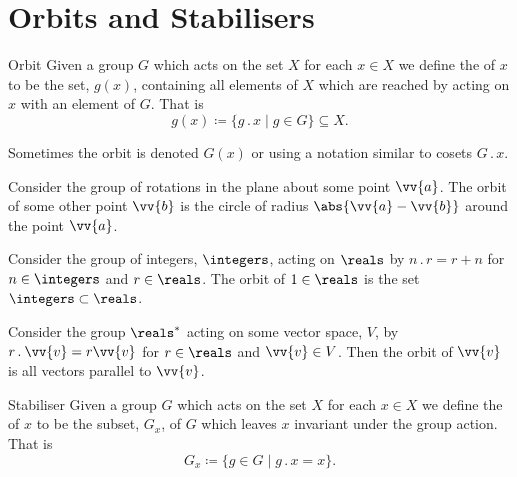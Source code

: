 \documentclass[fleqn]{NotesClass}
\newcommand*{\action}{\mathbin{.}}
\newcommand{\orbit}{\mathit{g}}
\begin{document}
    \section{Orbits and Stabilisers}
    
    \begin{dfn}{Orbit}{}
        Given a group \(G\) which acts on the set \(X\) for each \(x \in X\) we define the  of \(x\) to be the set, \(\orbit(x)\), containing all elements of \(X\) which are reached by acting on \(x\) with an element of \(G\).
        That is
        \begin{equation}
            \orbit(x) \coloneqq \{g\action x \mid g \in G\} \subseteq X.
        \end{equation}
        \begin{ntn}{}{}
            Sometimes the orbit is denoted \(G(x)\) or using a notation similar to cosets \(G\action x\).
        \end{ntn}
    \end{dfn}

    \begin{exm}{}{}
        Consider the group of rotations in the plane about some point \(\vv{a}\).
        The orbit of some other point \(\vv{b}\) is the circle of radius \(\abs{\vv{a} - \vv{b}}\) around the point \(\vv{a}\).
        
        Consider the group of integers, \(\integers\), acting on \(\reals\) by \(n\action r = r + n\) for \(n \in \integers\) and \(r\in\reals\).
        The orbit of \(1 \in \reals\) is the set \(\integers \subset \reals\).
        
        Consider the group \(\reals^*\) acting on some vector space, \(V\), by \(r \action \vv{v} = r\vv{v}\) for \(r \in \reals\) and \(\vv{v} \in V\).
        Then the orbit of \(\vv{v}\) is all vectors parallel to \(\vv{v}\).
    \end{exm}
    
    \begin{dfn}{Stabiliser}{}
        Given a group \(G\) which acts on the set \(X\) for each \(x \in X\) we define the  of \(x\) to be the subset, \(G_x\), of \(G\) which leaves \(x\) invariant under the group action.
        That is
        \begin{equation}
            G_x \coloneqq \{g \in G \mid g\action x = x\}.
        \end{equation}
    \end{dfn}
    
\end{document}
